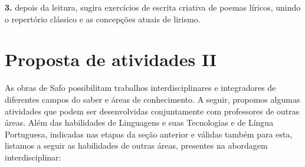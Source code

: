 \documentclass[12pt]{extarticle}
\begin{document}




\textbf{3.} depois da leitura, sugira exercícios de escrita criativa de
poemas líricos, unindo o repertório clássico e as concepções atuais de
lirismo.

\section{Proposta de atividades II}


As obras de Safo possibilitam trabalhos interdisciplinares e
integradores de diferentes campos do saber e áreas de conhecimento. A
seguir, propomos algumas atividades que podem ser desenvolvidas
conjuntamente com professores de outras áreas. Além das habilidades de
Linguagens e suas Tecnologias e de Língua Portuguesa, indicadas nas
etapas da seção anterior e válidas também para esta, listamos a seguir
as habilidades de outras áreas, presentes na abordagem interdisciplinar:



\end{document}

